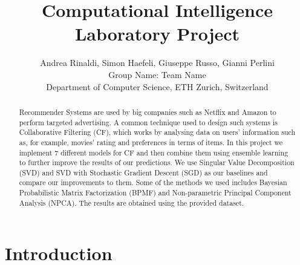 \documentclass[10pt,conference,compsocconf]{IEEEtran}
\begin{document}
\title{Computational Intelligence Laboratory Project}

\author{
  Andrea Rinaldi, Simon Haefeli, Giuseppe Russo, Gianni Perlini\\
  Group Name: Team Name \\
  Department of Computer Science, ETH Zurich, Switzerland
}

\maketitle

\begin{abstract}

Recommender Systems are used by big companies such as Netflix and Amazon to perform targeted advertising. A common technique used to design such systems is Collaborative Filtering (CF), which works by analysing data on users' information such as, for example, movies' rating and preferences in terms of items. In this project we implement 7 different models for CF and then combine them using ensemble learning to further improve the results of our predictions. We use Singular Value Decomposition (SVD) and SVD with Stochastic Gradient Descent (SGD) as our baselines and compare our improvements to them. Some of the methods we used includes Bayesian Probabilistic Matrix Factorization (BPMF) and Non-parametric Principal Component Analysis (NPCA). The results are obtained using the provided dataset. %

\end{abstract}

\section{Introduction}
\end{document}
